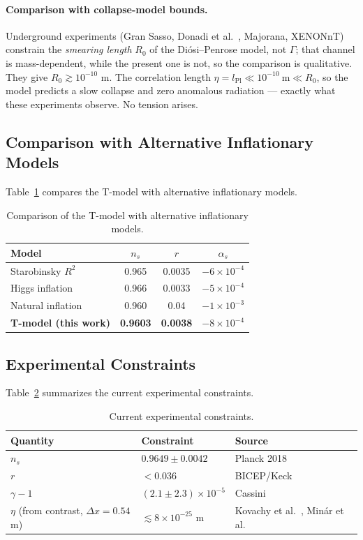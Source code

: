 \documentclass[11pt,a4paper]{article}
\begin{document}
\paragraph{Comparison with collapse-model bounds.}
Underground experiments (Gran Sasso, Donadi et
al.~\cite{Donadi2021}, Majorana, XENONnT) constrain the
\emph{smearing length} $R_{0}$ of the Di\'osi--Penrose model, not
$\Gamma$; that channel is mass-dependent, while the present one is
not, so the comparison is qualitative. They give
$R_{0}\gtrsim10^{-10}$ m. The correlation length
$\eta=l_{\mathrm{Pl}}\ll10^{-10}\ \mathrm{m}\ll R_{0}$, so the
model predicts a slow collapse and zero anomalous radiation ---
exactly what these experiments observe. No tension arises.

\subsection{Comparison with Alternative Inflationary Models}
Table~\ref{tab:models} compares the T-model with alternative
inflationary models.

\begin{table}[h]
\centering
\caption{Comparison of the T-model with alternative inflationary models.}
\label{tab:models}
\begin{tabular}{lccc}
\toprule
Model & $n_{s}$ & $r$ & $\alpha_{s}$\\
\midrule
Starobinsky $R^{2}$ & 0.965 & 0.0035 & $-6\times10^{-4}$\\
Higgs inflation & 0.966 & 0.0033 & $-5\times10^{-4}$\\
Natural inflation & 0.960 & 0.04 & $-1\times10^{-3}$\\
\textbf{T-model (this work)} & \textbf{0.9603} & \textbf{0.0038} & $-8\times10^{-4}$\\
\bottomrule
\end{tabular}
\end{table}

\subsection{Experimental Constraints}
Table~\ref{tab:constraints} summarizes the current experimental
constraints.

\begin{table}[h]
\centering
\caption{Current experimental constraints.}
\label{tab:constraints}
\begin{tabular}{lll}
\toprule
Quantity & Constraint & Source\\
\midrule
$n_{s}$ & $0.9649\pm0.0042$ & Planck 2018~\cite{Planck2018}\\
$r$ & $<0.036$ & BICEP/Keck~\cite{BICEPKeck}\\
$\gamma-1$ & $(2.1\pm2.3)\times10^{-5}$ & Cassini~\cite{Will}\\
$\eta$ (from contrast, $\Delta x=0.54$ m) &
$\lesssim8\times10^{-25}$ m & Kovachy et al.~\cite{KovachyNature},
Min\'ar et al.~\cite{Minar}\\
\bottomrule
\end{tabular}
\end{table}
\end{document}
